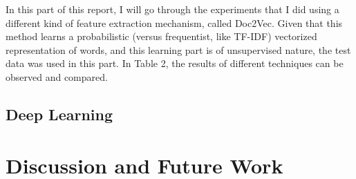 \documentclass{article}
\begin{document}
In this part of this report, I will go through the experiments that I did using a different kind of feature extraction mechanism, called Doc2Vec. Given that this method learns a probabilistic (versus frequentist, like TF-IDF) vectorized representation of words, and this learning part is of unsupervised nature, the test data was used in this part. In Table 2, the results of different techniques can be observed and compared. 

\begin{table}[]
\caption{Doc2Vec Results}
\label{my-label}
\end{table}

	\subsection{Deep Learning}
	\section{Discussion and Future Work}
\end{document}
